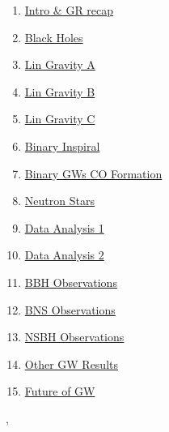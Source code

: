 \documentclass[11pt]{article}
\renewcommand{\today}{\shortmonthname[\the\month] \the \day,  \the\year}
\begin{document}
\begin{multicols}{2}
	\begin{enumerate}
		\item \href{https://mp.weixin.qq.com/s/BIsmv45pCm-sOdj7QhQtOw}{Intro \& GR recap}	%
		\item \href{https://mp.weixin.qq.com/s/K5_83yhJaaguoWVCIsQ29A}{Black Holes}	%
		\item \href{https://mp.weixin.qq.com/s/UqJANWxiqxBUpxhTf57bdw}{Lin Gravity A}	%
		\item \href{https://mp.weixin.qq.com/s/JhEt_cyDaB_Hjn-_miVnGg}{Lin Gravity B}	%
		\item \href{https://mp.weixin.qq.com/s/YU2ZHBKsQBnncgvwmt0hQQ}{Lin Gravity C}	%
		\item \href{https://mp.weixin.qq.com/s/MY2-Kf2evxBEJon8Dfk7Qg}{Binary Inspiral}	%
		\item \href{https://mp.weixin.qq.com/s/4wh3Go5Q5t507Oj3hIwHPw}{Binary GWs CO Formation}	%
		\item \href{https://mp.weixin.qq.com/s/wCaH8eTMPqeIlDgtMYvEBg}{Neutron Stars}	%
		\item \href{https://mp.weixin.qq.com/s/AaNyg-7laPdtqUR9Ads4CQ}{Data Analysis 1}	%
		\item \href{https://mp.weixin.qq.com/s/i50A-VO5aAaWui0etiN-WA}{Data Analysis 2}	%
		\item \href{https://mp.weixin.qq.com/s/sx1B3u70I17nENWXa-zpBQ}{BBH Observations}	%
		\item \href{https://mp.weixin.qq.com/s/Dsz3clbCgIY9ZNyshRlHmA}{BNS Observations}	%
		\item \href{https://mp.weixin.qq.com/s/Ea9_GIU8ZG0K3XSBPFzr6w}{NSBH Observations}	%
		\item \href{https://mp.weixin.qq.com/s/LIbd3w-ydtcKJCPz--PgTQ}{Other GW Results}	%
		\item \href{https://mp.weixin.qq.com/s/izVEJFKYWB3DAe3zq9NVIA}{Future of GW}	%
	\end{enumerate}
\end{multicols}





%
\begin{flushright}
	\tiny \today 
\end{flushright}
\end{document}
